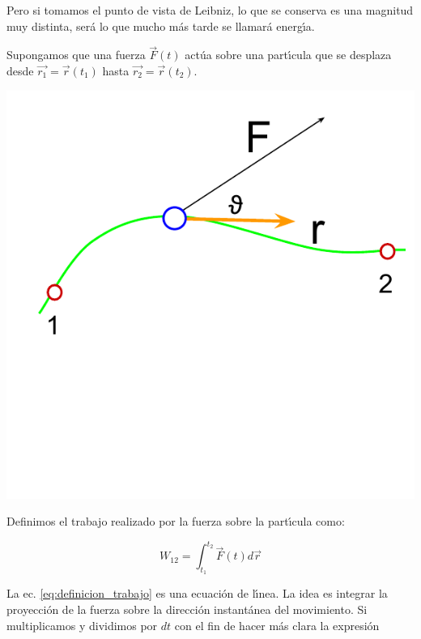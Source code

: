 Pero si tomamos el punto de vista de Leibniz, lo que se conserva es una magnitud muy distinta, ser\'a lo que mucho m\'as tarde se llamar\'a energ\'\i{}a. 

Supongamos que una fuerza $\vec{F}(t)$ act\'ua sobre una part\'\i{}cula que se desplaza desde $\vec{r_1}=\vec{r}(t_1)$ hasta $\vec{r_2}=\vec{r}(t_2)$. 
\begin{marginfigure}
  \includegraphics[width=\linewidth]{TrabajoParticulaPuntual.pdf}
  \caption{Trabajo realizado por la fuerza F actuando sobre la part\'\i{}cula que se desplaza a lo largo de una curva de 1 a 2.Obs\'ervese que s\'olo la componente tangencial de la fuerza realiza trabajo sobre la part\'\i{}cula}
  \label{fig:trabajo_particula}
\end{marginfigure}
Definimos el trabajo realizado por la fuerza sobre la part\'\i{}cula como: 

\begin{equation}
W_{12}=\int_{t_1}^{t_2} \vec{F}(t)d\vec{r}
\label{eq:definicion_trabajo}
\end{equation}

La ec. \ref{eq:definicion_trabajo} es una ecuaci\'on de l\'\i{}nea. La idea es integrar la proyecci\'on de la fuerza sobre la direcci\'on instant\'anea del movimiento. Si multiplicamos y dividimos por $dt$ con el fin de hacer m\'as clara la expresi\'on

